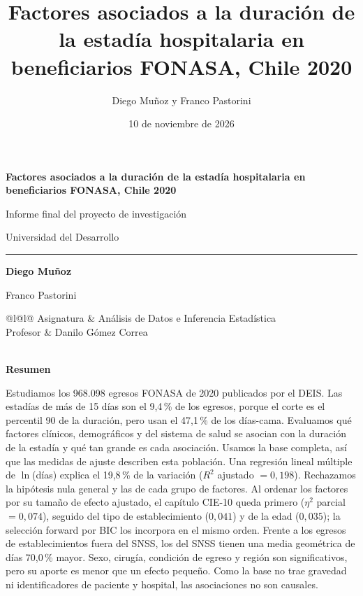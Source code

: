 \documentclass[10.5pt,a4paper,headings=small,abstract=false,bibliography=totoc,listof=totoc]{scrartcl}
\title{Factores asociados a la duración de la estadía hospitalaria en beneficiarios FONASA, Chile 2020}
\author{Diego Muñoz y Franco Pastorini}
\date{10 de noviembre de 2026}
\newcommand{\cie}{\mbox{CIE-10}}
\newcommand{\pct}{\,\%}
\begin{document}
\begin{titlepage}
\thispagestyle{plain}
\raggedright
\vspace*{5.5cm}
{\sffamily\bfseries\color{acento}\fontsize{24}{29}\selectfont Factores asociados a la duración de la estadía hospitalaria en beneficiarios FONASA, Chile 2020\par}
\vspace{1.2em}
{\color{gris}\large Informe final del proyecto de investigación\par}
\vspace{0.3em}
{\color{gris}\large Universidad del Desarrollo\par}
\vspace{0.8em}
{\color{filete}\rule{\textwidth}{0.6pt}}\par
\vfill
{\sffamily\bfseries\large Diego Muñoz\par Franco Pastorini\par}
\vspace{1.4em}
{\small
\begin{tabular}{@{}l@{\hspace{1.2em}}l@{}}
\color{gris}Asignatura & Análisis de Datos e Inferencia Estadística \\
\color{gris}Profesor & Danilo Gómez Correa \\
 \\
\end{tabular}\par}
\vspace{1cm}
\end{titlepage}
\setcounter{page}{2}

{\sffamily\bfseries\color{acento}\Large Resumen}\par\vspace{0.6em}
Estudiamos los 968.098 egresos FONASA de 2020 publicados por el DEIS. Las estadías de más de 15 días son el 9,4\pct{} de los egresos, porque el corte es el percentil 90 de la duración, pero usan el 47,1\pct{} de los días-cama. Evaluamos qué factores clínicos, demográficos y del sistema de salud se asocian con la duración de la estadía y qué tan grande es cada asociación. Usamos la base completa, así que las medidas de ajuste describen esta población. Una regresión lineal múltiple de $\ln$(días) explica el 19,8\pct{} de la variación ($R^2$ ajustado $=0{,}198$). Rechazamos la hipótesis nula general y las de cada grupo de factores. Al ordenar los factores por su tamaño de efecto ajustado, el capítulo \cie{} queda primero ($\eta^2$ parcial $=0{,}074$), seguido del tipo de establecimiento ($0{,}041$) y de la edad ($0{,}035$); la selección forward por BIC los incorpora en el mismo orden. Frente a los egresos de establecimientos fuera del SNSS, los del SNSS tienen una media geométrica de días 70,0\pct{} mayor. Sexo, cirugía, condición de egreso y región son significativos, pero su aporte es menor que un efecto pequeño. Como la base no trae gravedad ni identificadores de paciente y hospital, las asociaciones no son causales.
\end{document}
